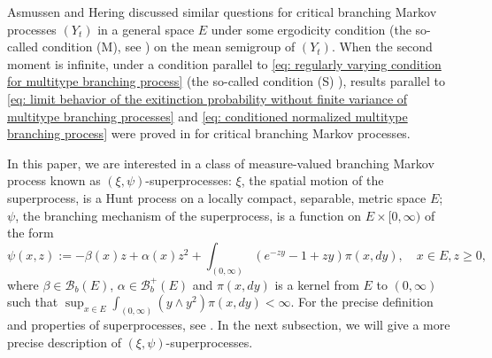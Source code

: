 \documentclass[12pt, a4paper]{amsart}
\theoremstyle{definition}
\numberwithin{equation}{section}
\begin{document}
	Asmussen and Hering \cite[Section~6.3~and~6.4]{AsmussenHering1983Branching} discussed similar questions for critical branching Markov processes $(Y_t)$ in a general space $E$ under some ergodicity condition (the so-called condition (M), see \cite[p.~156]{AsmussenHering1983Branching}) on the mean semigroup of $(Y_t)$.
When the second moment is infinite, under a condition  parallel  to \eqref{eq: regularly varying condition for multitype branching process} (the so-called condition (S) \cite[p.~207]{AsmussenHering1983Branching}), results parallel to \eqref{eq: limit behavior of the exitinction probability without finite variance of multitype branching processes} and \eqref{eq: conditioned normalized multitype branching process} were proved in \cite[Theorem~4.2]{AsmussenHering1983Branching} for critical branching Markov processes.

    In this paper, we are interested in a class of measure-valued branching Markov process known as $(\xi, \psi)$-superprocesses:
    $\xi$, the spatial motion of the superprocess, is a Hunt process on a locally compact, separable, metric space $E$;
    $\psi$, the branching mechanism of the superprocess,
    is a function on $E \times [0,\infty)$ of the form
\[ \label{eq: branching mechanism}
	\psi(x,z):=
	- \beta(x) z + \alpha (x) z^2 + \int_{(0,\infty)} (e^{-zy} - 1 + zy) \pi(x,dy),
	\quad x\in E, z\geq 0,
\]
	where $\beta \in \mathscr B_b(E)$, $\alpha \in \mathscr B^+_b(E)$ and $\pi(x,dy)$ is a kernel from $E$ to $(0,\infty)$ such that $\sup_{x\in E} \int_{(0,\infty)} (y\wedge y^2) \pi(x,dy) < \infty$.
	For the precise definition and properties of superprocesses, see \cite{Li2011Measure-valued}.
	In the next subsection, we will give a more precise description of $(\xi, \psi)$-superprocesses.
\end{document}
